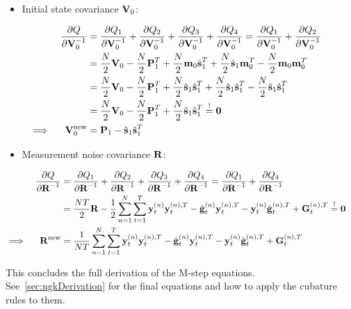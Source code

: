 		\begin{itemize}
			\item Initial state covariance \(\boldsymbol{\mathrm{V}}_0\):
		\end{itemize}
		\begin{align}
			&&\pdv{Q}{\boldsymbol{\mathrm{V}}_0^{-1}}
				&= \pdv{Q_1}{\boldsymbol{\mathrm{V}}_0^{-1}} + \pdv{Q_2}{\boldsymbol{\mathrm{V}}_0^{-1}} + \pdv{Q_3}{\boldsymbol{\mathrm{V}}_0^{-1}} + \pdv{Q_4}{\boldsymbol{\mathrm{V}}_0^{-1}} = \pdv{Q_1}{\boldsymbol{\mathrm{V}}_0^{-1}} + \pdv{Q_2}{\boldsymbol{\mathrm{V}}_0^{-1}} & \nonumber \\
			&&	&= \frac{N}{2} \boldsymbol{\mathrm{V}}_0 - \frac{N}{2} \boldsymbol{\mathrm{P}}_1^T + \frac{N}{2} \boldsymbol{\mathrm{m}}_0 \hat{\boldsymbol{\mathrm{s}}}_1^T + \frac{N}{2} \hat{\boldsymbol{\mathrm{s}}}_1 \boldsymbol{\mathrm{m}}_0^T - \frac{N}{2} \boldsymbol{\mathrm{m}}_0 \boldsymbol{\mathrm{m}}_0^T & \nonumber \\
			&&	&= \frac{N}{2} \boldsymbol{\mathrm{V}}_0 - \frac{N}{2} \boldsymbol{\mathrm{P}}_1^T + \frac{N}{2} \hat{\boldsymbol{\mathrm{s}}}_1 \hat{\boldsymbol{\mathrm{s}}}_1^T + \frac{N}{2} \hat{\boldsymbol{\mathrm{s}}}_1 \hat{\boldsymbol{\mathrm{s}}}_1^T - \frac{N}{2} \hat{\boldsymbol{\mathrm{s}}}_1 \hat{\boldsymbol{\mathrm{s}}}_1^T & \nonumber \\
			&&	&= \frac{N}{2} \boldsymbol{\mathrm{V}}_0 - \frac{N}{2} \boldsymbol{\mathrm{P}}_1^T + \frac{N}{2} \hat{\boldsymbol{\mathrm{s}}}_1 \hat{\boldsymbol{\mathrm{s}}}_1^T \overset{!}{=} \boldsymbol{\mathrm{0}} & \nonumber \\
			\implies && \boldsymbol{\mathrm{V}}_0^{\mathrm{new}} &= \boldsymbol{\mathrm{P}}_1 - \hat{\boldsymbol{\mathrm{s}}}_1 \hat{\boldsymbol{\mathrm{s}}}_1^T & \label{eq:initialStateCovariance}
		\end{align}

		\begin{itemize}
			\item Measurement noise covariance \(\boldsymbol{\mathrm{R}}\):
		\end{itemize}
		\begin{align}
			&&\pdv{Q}{\boldsymbol{\mathrm{R}}^{-1}}
				&= \pdv{Q_1}{\boldsymbol{\mathrm{R}}^{-1}} + \pdv{Q_2}{\boldsymbol{\mathrm{R}}^{-1}} + \pdv{Q_3}{\boldsymbol{\mathrm{R}}^{-1}} + \pdv{Q_4}{\boldsymbol{\mathrm{R}}^{-1}} = \pdv{Q_1}{\boldsymbol{\mathrm{R}}^{-1}} + \pdv{Q_4}{\boldsymbol{\mathrm{R}}^{-1}} & \nonumber \\
			&&	&= \frac{NT}{2} \boldsymbol{\mathrm{R}} - \frac{1}{2} \sum_{n = 1}^{N} \sum_{t = 1}^{T} \boldsymbol{\mathrm{y}}_t^{(n)} \boldsymbol{\mathrm{y}}_t^{(n), T} - \hat{\boldsymbol{\mathrm{g}}}_t^{(n)} \boldsymbol{\mathrm{y}}_t^{(n), T} - \boldsymbol{\mathrm{y}}_t^{(n)} \hat{\boldsymbol{\mathrm{g}}}_t^{(n), T} + \boldsymbol{\mathrm{G}}_t^{(n), T} \overset{!}{=} \boldsymbol{\mathrm{0}} & \nonumber \\
			\implies && \boldsymbol{\mathrm{R}}^{\mathrm{new}} &= \frac{1}{NT} \sum_{n = 1}^{N} \sum_{t = 1}^{T} \boldsymbol{\mathrm{y}}_t^{(n)} \boldsymbol{\mathrm{y}}_t^{(n), T} - \hat{\boldsymbol{\mathrm{g}}}_t^{(n)} \boldsymbol{\mathrm{y}}_t^{(n), T} - \boldsymbol{\mathrm{y}}_t^{(n)} \hat{\boldsymbol{\mathrm{g}}}_t^{(n), T} + \boldsymbol{\mathrm{G}}_t^{(n), T} & \label{eq:measurementNoiseCovariance}
		\end{align}

		This concludes the full derivation of the M-step equations. See~\autoref{sec:ngkDerivation} for the final equations and how to apply the cubature rules to them.
		\pagebreak

